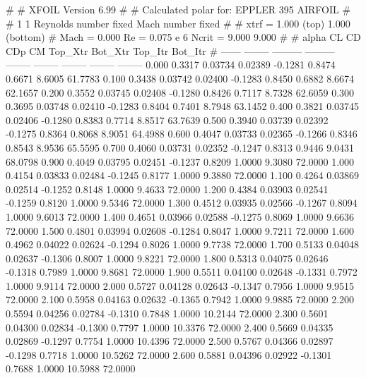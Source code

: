 #  
#       XFOIL         Version 6.99
#  
# Calculated polar for: EPPLER 395 AIRFOIL                              
#  
# 1 1 Reynolds number fixed          Mach number fixed         
#  
# xtrf =   1.000 (top)        1.000 (bottom)  
# Mach =   0.000     Re =     0.075 e 6     Ncrit =   9.000  9.000
#  
#   alpha    CL        CD       CDp       CM     Top_Xtr  Bot_Xtr  Top_Itr  Bot_Itr
#  ------ -------- --------- --------- -------- -------- -------- -------- --------
   0.000   0.3317   0.03734   0.02389  -0.1281   0.8474   0.6671   8.6005  61.7783
   0.100   0.3438   0.03742   0.02400  -0.1283   0.8450   0.6882   8.6674  62.1657
   0.200   0.3552   0.03745   0.02408  -0.1280   0.8426   0.7117   8.7328  62.6059
   0.300   0.3695   0.03748   0.02410  -0.1283   0.8404   0.7401   8.7948  63.1452
   0.400   0.3821   0.03745   0.02406  -0.1280   0.8383   0.7714   8.8517  63.7639
   0.500   0.3940   0.03739   0.02392  -0.1275   0.8364   0.8068   8.9051  64.4988
   0.600   0.4047   0.03733   0.02365  -0.1266   0.8346   0.8543   8.9536  65.5595
   0.700   0.4060   0.03731   0.02352  -0.1247   0.8313   0.9446   9.0431  68.0798
   0.900   0.4049   0.03795   0.02451  -0.1237   0.8209   1.0000   9.3080  72.0000
   1.000   0.4154   0.03833   0.02484  -0.1245   0.8177   1.0000   9.3880  72.0000
   1.100   0.4264   0.03869   0.02514  -0.1252   0.8148   1.0000   9.4633  72.0000
   1.200   0.4384   0.03903   0.02541  -0.1259   0.8120   1.0000   9.5346  72.0000
   1.300   0.4512   0.03935   0.02566  -0.1267   0.8094   1.0000   9.6013  72.0000
   1.400   0.4651   0.03966   0.02588  -0.1275   0.8069   1.0000   9.6636  72.0000
   1.500   0.4801   0.03994   0.02608  -0.1284   0.8047   1.0000   9.7211  72.0000
   1.600   0.4962   0.04022   0.02624  -0.1294   0.8026   1.0000   9.7738  72.0000
   1.700   0.5133   0.04048   0.02637  -0.1306   0.8007   1.0000   9.8221  72.0000
   1.800   0.5313   0.04075   0.02646  -0.1318   0.7989   1.0000   9.8681  72.0000
   1.900   0.5511   0.04100   0.02648  -0.1331   0.7972   1.0000   9.9114  72.0000
   2.000   0.5727   0.04128   0.02643  -0.1347   0.7956   1.0000   9.9515  72.0000
   2.100   0.5958   0.04163   0.02632  -0.1365   0.7942   1.0000   9.9885  72.0000
   2.200   0.5594   0.04256   0.02784  -0.1310   0.7848   1.0000  10.2144  72.0000
   2.300   0.5601   0.04300   0.02834  -0.1300   0.7797   1.0000  10.3376  72.0000
   2.400   0.5669   0.04335   0.02869  -0.1297   0.7754   1.0000  10.4396  72.0000
   2.500   0.5767   0.04366   0.02897  -0.1298   0.7718   1.0000  10.5262  72.0000
   2.600   0.5881   0.04396   0.02922  -0.1301   0.7688   1.0000  10.5988  72.0000
